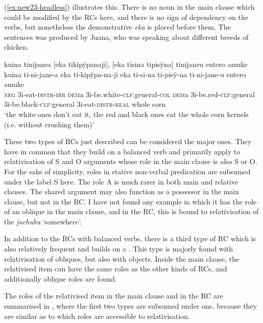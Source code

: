 (\ref{ex:new23-headless}) illustrates this. There is no noun in the main clause which could be modified by the RCs here, and there is no sign of dependency on the verbs, but nonetheless the demonstrative \textit{eka} is placed before them. The sentences was produced by Juana, who was speaking about different breeds of chicken.

\ea\label{ex:new23-headless}
\begingl
\glpreamble kuina tinijanea \textup{[}eka tikipÿpanaji\textup{]}, \textup{[}eka tisina tipisÿna\textup{]} tinijaneu entero amuke\\
\gla kuina ti-ni-jane-a eka ti-kipÿpa-na-ji eka ti-si-na ti-pisÿ-na ti-ni-jane-u entero amuke\\
\glb \textsc{neg} 3i-eat-\textsc{distr}-\textsc{irr} \textsc{dem}a 3i-be.white-\textsc{clf:}general-\textsc{col} \textsc{dem}a 3i-be.red-\textsc{clf:}general 3i-be.black-\textsc{clf:}general 3i-eat-\textsc{distr}-\textsc{real} whole corn\\
\glft ‘the white ones don’t eat it, the red and black ones eat the whole corn kernels (i.e. without crushing them)’
\endgl
\trailingcitation{[jxx-e150925l-1.143-144]}
\xe{}

These two types of RCs just described can be considered the major ones. They have in common that they build on a balanced verb and primarily apply to relativisation of S and O arguments whose role in the main clause is also S or O. For the sake of simplicity, roles in stative non-verbal predication are subsumed under the label S here. The role A is much rarer in both main and relative clauses. The shared argument may also function as a possessor in the main clause, but not in the RC. I have not found any example in which it has the role of an oblique in the main clause, and in the RC, this is bound to relativisation of the  \textit{juchubu} ‘somewhere’. 

In addition to the RCs with balanced verbs, there is a third type of RC which is also relatively frequent and builds on a . This type is majorly found with relativisation of obliques, but also with objects. Inside the main clause, the relativised item can have the same roles as the other kinds of RCs, and additionally oblique roles are found.

The roles of the relativised item in the main clause and in the RC are summarised in  , where the first two types are subsumed under one, because they are similar as to which roles are accessible to relativisation.

